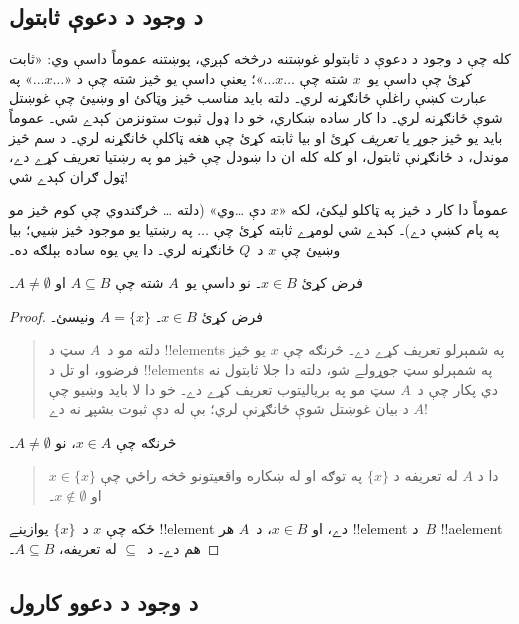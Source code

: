 \documentclass[../../../include/open-logic-section]{subfiles}
\begin{document}
\subsection{د وجود د دعوې ثابتول}

کله چې د وجود د دعوې د ثابتولو غوښتنه
درڅخه کېږي، پوښتنه عموماً داسې وي:
«ثابت کړئ چې داسې يو~$x$ شته چې
$\dots x \dots$»؛ يعنې داسې يو
څيز شته چې د «$\dots x
\dots$» په عبارت کښې راغلې
ځانګړنه لري۔ دلته بايد مناسب
څيز وټاکئ او وښيئ چې غوښتل
شوې ځانګړنه لري۔ دا کار
ساده ښکاري، خو دا ډول ثبوت
ستونزمن کېدے شي۔ عموماً بايد
يو څيز \emph{جوړ} يا
\emph{تعريف} کړئ او بيا
ثابته کړئ چې هغه ټاکلې
ځانګړنه لري۔ د سم څيز
موندل، د ځانګړنې ثابتول،
او کله کله ان دا ښودل
چې څيز مو په رښتيا تعريف
کړے دے، ټول ګران کېدے شي!{}

عموماً دا کار د څيز په ټاکلو ليکئ،
لکه «$x$ دې \dots وي» (دلته
\dots{} څرګندوي چې کوم څيز
مو په پام کښې دے)۔ کېدے شي
لومړے ثابته کړئ چې $\dots$
په رښتيا يو موجود څيز ښيي؛
بيا وښيئ چې $x$ د~$Q$
ځانګړنه لري۔ دا يې يوه ساده
بېلګه ده۔

\begin{prop}
  فرض کړئ $x \in B$۔ نو داسې يو~$A$
  شته چې $A \subseteq
  B$ او $A \neq \emptyset$۔
\end{prop}

\begin{proof}
  فرض کړئ $x \in B$۔ $A = \{x\}$ ونيسئ۔
  \begin{quote}
    دلته مو د~$A$ سټ د
    !!{element}s په شمېرلو تعريف کړے دے۔
    څرنګه چې $x$ يو څيز
    فرضوو، او تل د !!{element}s
    په شمېرلو سټ جوړولے
    شو، دلته دا جلا ثابتول
    نه دي پکار چې د~$A$
    سټ مو په برياليتوب
    تعريف کړے دے۔ خو دا
    لا بايد وښيو چې $A$
    د بيان غوښتل شوې
    ځانګړنې لري؛ بې له
    دې ثبوت بشپړ نه دے!{}
  \end{quote}
  څرنګه چې $x \in A$،
  نو $A \neq \emptyset$۔
  \begin{quote}
    دا د $A$ له تعريفه
    د $\{x\}$ په توګه
    او له ښکاره واقعيتونو
    څخه راځي چې
    $x \in \{x\}$
    او $x \notin \emptyset$۔
  \end{quote}
  ځکه چې $x$ د~$\{x\}$
  يوازينے !!{element} دے،
  او $x \in B$، د~$A$
  هر !!{element} د~$B$
  !!a{element} هم دے۔
  د~$\subseteq$ له تعريفه،
  $A \subseteq B$۔
\end{proof}

\subsection{د وجود د دعوو کارول}
\end{document}
